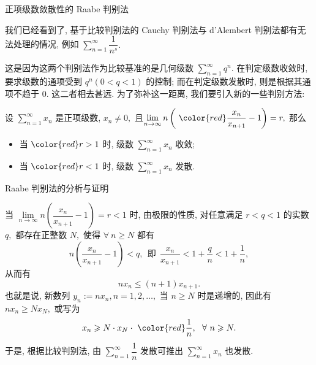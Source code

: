 \begin{frame}{正项级数敛散性的 Raabe 判别法}

我们已经看到了, 基于比较判别法的 Cauchy 判别法与 d'Alembert 判别法都有无法处理的情况, 例如 $\sum\limits_{n=1}^\infty \dfrac{1}{n^s}.$

\pause
\vspace{-0.6em}

这是因为这两个判别法作为比较基准的是几何级数 $\sum\limits_{n=1}^\infty q^n.$ 在判定级数收敛时, 要求级数的通项受到 $q^n (0 < q < 1)$ 的控制; 而在判定级数发散时, 则是根据其通项不趋于 $0.$ 这二者相去甚远. 为了弥补这一距离, 我们要引入新的一些判别方法:

\pause

\begin{thm}
设 $\sum\limits_{n=1}^\infty x_n$ 是正项级数, $x_n \neq 0,$ 且$\lim\limits_{n\to\infty} n \left( ~ {\color{red}\dfrac{x_n}{x_{n+1}}} - 1 \right) = r,$ 那么
\vspace{-0.6em}
\begin{itemize}
\item[(1).] 当 ${\color{red}r > 1}$ 时, 级数 $\sum\limits_{n=1}^\infty x_n$ {\color{red}收敛};
\item[(2).] 当 ${\color{red}r < 1}$ 时, 级数 $\sum\limits_{n=1}^\infty x_n$ {\color{red}发散}.
\end{itemize}
\end{thm}

\end{frame}


\begin{frame}{Raabe 判别法的分析与证明}

当 $\lim\limits_{n\to\infty} n \left( \dfrac{x_n}{x_{n+1}} - 1 \right) = r < 1$ 时, 由极限的性质, 对任意满足 $r < q < 1$ 的实数 $q,$ 都存在正整数 $N,$ 使得 $\forall~n \geqslant N$ 都有
\[n \left( \dfrac{x_n}{x_{n+1}} - 1 \right) < q, ~~ \text{即} ~~ \dfrac{x_n}{x_{n+1}} < 1 + \dfrac{q}{n} < 1 + \dfrac{1}{n},\]
从而有
\[n x_n \leqslant (n+1) x_{n+1}.\]
\pause
也就是说, 新数列 $y_n := nx_n, n = 1, 2, \dots,$ 当 $n \geqslant N$ 时是递增的, 因此有 $n x_n \geqslant N x_N,$ 或写为
\[x_n \geqslant N \cdot x_N \cdot ~ {\color{red} \dfrac{1}{n}}, ~~ \forall~n \geqslant N.\]
于是, 根据比较判别法, 由 $\sum\limits_{n=1}^\infty \dfrac{1}{n}$ 发散可推出 $\sum\limits_{n=1}^\infty x_n$ 也发散.

\end{frame}

